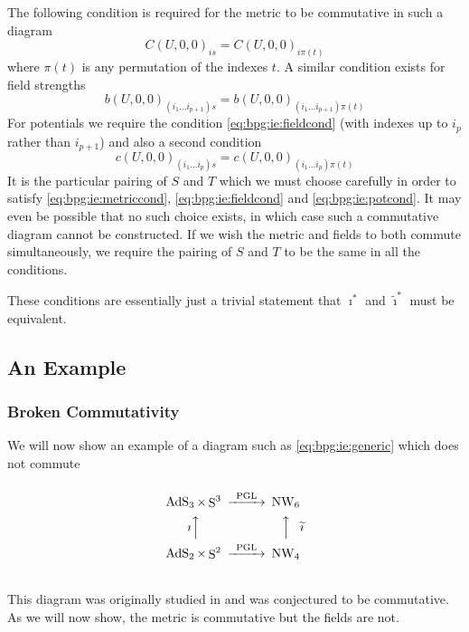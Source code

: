 \documentclass[11pt, a4paper, titlepage]{article}
\DeclareMathOperator{\AdS}{AdS}
\DeclareMathOperator{\Sphere}{S}
\DeclareMathOperator{\NW}{NW}
\let\S\Sphere
\begin{document}
The following condition is required for the metric to be commutative in such a
diagram
\begin{equation}
  \label{eq:bpg:ie:metriccond}
  C(U,0,0)_{is} = C(U,0,0)_{i\pi(t)}
\end{equation}
where $\pi(t)$ is any permutation of the indexes $t$. A similar condition exists
for field strengths
\begin{equation}
  \label{eq:bpg:ie:fieldcond}
  b(U,0,0)_{(i_1\ldots i_{p+1})s} = b(U,0,0)_{(i_1\ldots i_{p+1})\pi(t)}
\end{equation}
For potentials we require the condition \eqref{eq:bpg:ie:fieldcond} (with
indexes up to $i_p$ rather than $i_{p+1}$) and also a second condition
\begin{equation}
  \label{eq:bpg:ie:potcond}
  c(U,0,0)_{(i_1\ldots i_{p})s} = c(U,0,0)_{(i_1\ldots i_{p})\pi(t)}
\end{equation}
It is the particular pairing of $S$ and $T$ which we must choose carefully in
order to satisfy \eqref{eq:bpg:ie:metriccond}, \eqref{eq:bpg:ie:fieldcond} and
\eqref{eq:bpg:ie:potcond}. It may even be possible that no such choice exists,
in which case such a commutative diagram cannot be constructed. If we wish the
metric and fields to both commute simultaneously, we require the pairing of $S$
and $T$ to be the same in all the conditions.

These conditions are essentially just a trivial statement that $\imath^*$ and
$\widetilde{\imath}^*$ must be equivalent.

\subsection{An Example}
\subsubsection{Broken Commutativity}
We will now show an example of a diagram such as \eqref{eq:bpg:ie:generic} which
does not commute
\begin{equation}
  \label{eq:bpg:ex:jose}
  \begin{CD}
    @.\\
    \AdS_3 \times \S^3    @>\text{PGL}>>          \NW_6\\
    \text{$\imath$}@AAA @AAA\text{$\widetilde{\imath}$}\\
    \AdS_2 \times \S^2    @>\text{PGL}>>          \NW_4\\
    @.
  \end{CD}
\end{equation}
This diagram was originally studied in \cite{plsbd, pllbnwb} and was conjectured
to be commutative. As we will now show, the metric is commutative but the fields
are not.
\end{document}
